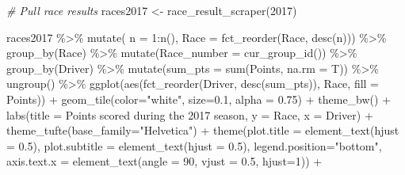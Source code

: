 \documentclass[
]{book}
\newenvironment{Shaded}{\begin{snugshade}}{\end{snugshade}}
\newcommand{\AttributeTok}[1]{\textcolor[rgb]{0.77,0.63,0.00}{#1}}
\newcommand{\CommentTok}[1]{\textcolor[rgb]{0.56,0.35,0.01}{\textit{#1}}}
\newcommand{\DecValTok}[1]{\textcolor[rgb]{0.00,0.00,0.81}{#1}}
\newcommand{\FloatTok}[1]{\textcolor[rgb]{0.00,0.00,0.81}{#1}}
\newcommand{\FunctionTok}[1]{\textcolor[rgb]{0.00,0.00,0.00}{#1}}
\newcommand{\NormalTok}[1]{#1}
\newcommand{\OtherTok}[1]{\textcolor[rgb]{0.56,0.35,0.01}{#1}}
\newcommand{\SpecialCharTok}[1]{\textcolor[rgb]{0.00,0.00,0.00}{#1}}
\newcommand{\StringTok}[1]{\textcolor[rgb]{0.31,0.60,0.02}{#1}}
\begin{document}
\begin{Shaded}
\begin{Highlighting}[]
\CommentTok{\# Pull race results}
\NormalTok{races2017 }\OtherTok{\textless{}{-}} \FunctionTok{race\_result\_scraper}\NormalTok{(}\DecValTok{2017}\NormalTok{)}

\NormalTok{races2017 }\SpecialCharTok{\%\textgreater{}\%}
  \FunctionTok{mutate}\NormalTok{( }\AttributeTok{n =} \DecValTok{1}\SpecialCharTok{:}\FunctionTok{n}\NormalTok{(),}
          \AttributeTok{Race =} \FunctionTok{fct\_reorder}\NormalTok{(Race, }\FunctionTok{desc}\NormalTok{(n))) }\SpecialCharTok{\%\textgreater{}\%}
  \FunctionTok{group\_by}\NormalTok{(Race) }\SpecialCharTok{\%\textgreater{}\%} 
  \FunctionTok{mutate}\NormalTok{(}\AttributeTok{Race\_number =} \FunctionTok{cur\_group\_id}\NormalTok{()) }\SpecialCharTok{\%\textgreater{}\%}
  \FunctionTok{group\_by}\NormalTok{(Driver) }\SpecialCharTok{\%\textgreater{}\%} 
  \FunctionTok{mutate}\NormalTok{(}\AttributeTok{sum\_pts =} \FunctionTok{sum}\NormalTok{(Points, }\AttributeTok{na.rm =}\NormalTok{ T)) }\SpecialCharTok{\%\textgreater{}\%}
  \FunctionTok{ungroup}\NormalTok{() }\SpecialCharTok{\%\textgreater{}\%} 
  \FunctionTok{ggplot}\NormalTok{(}\FunctionTok{aes}\NormalTok{(}\FunctionTok{fct\_reorder}\NormalTok{(Driver, }\FunctionTok{desc}\NormalTok{(sum\_pts)), Race, }\AttributeTok{fill =}\NormalTok{ Points)) }\SpecialCharTok{+}
  \FunctionTok{geom\_tile}\NormalTok{(}\AttributeTok{color=}\StringTok{"white"}\NormalTok{, }\AttributeTok{size=}\FloatTok{0.1}\NormalTok{, }\AttributeTok{alpha =} \FloatTok{0.75}\NormalTok{) }\SpecialCharTok{+}
  \FunctionTok{theme\_bw}\NormalTok{() }\SpecialCharTok{+}
  \FunctionTok{labs}\NormalTok{(}\AttributeTok{title =} \StringTok{\textquotesingle{}Points scored during the 2017 season\textquotesingle{}}\NormalTok{,}
       \AttributeTok{y =} \StringTok{\textquotesingle{}Race\textquotesingle{}}\NormalTok{,}
       \AttributeTok{x =} \StringTok{\textquotesingle{}Driver\textquotesingle{}}\NormalTok{) }\SpecialCharTok{+} 
  \FunctionTok{theme\_tufte}\NormalTok{(}\AttributeTok{base\_family=}\StringTok{"Helvetica"}\NormalTok{)  }\SpecialCharTok{+}
  \FunctionTok{theme}\NormalTok{(}\AttributeTok{plot.title =} \FunctionTok{element\_text}\NormalTok{(}\AttributeTok{hjust =} \FloatTok{0.5}\NormalTok{),}
        \AttributeTok{plot.subtitle =} \FunctionTok{element\_text}\NormalTok{(}\AttributeTok{hjust =} \FloatTok{0.5}\NormalTok{),}
        \AttributeTok{legend.position=}\StringTok{"bottom"}\NormalTok{,}
        \AttributeTok{axis.text.x =} \FunctionTok{element\_text}\NormalTok{(}\AttributeTok{angle =} \DecValTok{90}\NormalTok{, }\AttributeTok{vjust =} \FloatTok{0.5}\NormalTok{, }\AttributeTok{hjust=}\DecValTok{1}\NormalTok{)) }\SpecialCharTok{+}

\end{Highlighting}
\end{Shaded}
\end{document}
